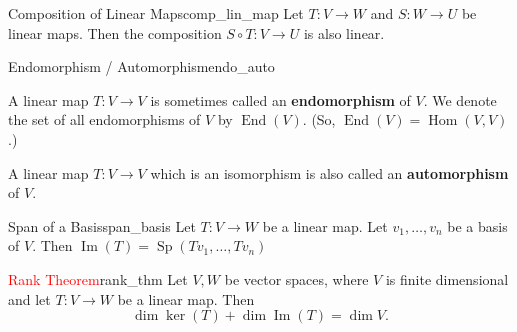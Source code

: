 \begin{lemma}{Composition of Linear Maps}{comp_lin_map}
	Let $T:V \to W$ and $S:W \to U$ be linear maps. Then the composition $S \circ T:V \to U$ is also linear.
\end{lemma}

\begin{definition}{Endomorphism / Automorphism}{endo_auto}
	
	A linear map $T:V \to V$ is sometimes called an \textbf{endomorphism} of $V$. We denote the set of all endomorphisms of $V$ by $\operatorname{End}(V)$. (So, $\operatorname{End}(V) = \operatorname{Hom}(V, V)$.)
	
	A linear map $T:V \to V$ which is an isomorphism is also called an \textbf{automorphism} of $V$.
\end{definition}

\begin{lemma}{Span of a Basis}{span_basis}
	Let $T:V \to W$ be a linear map. Let $v_1, \hdots , v_n$ be a basis of $V$. Then $\operatorname{Im}(T) = \operatorname{Sp}(Tv_1, \hdots , Tv_n)$
\end{lemma}

\begin{theorem}{\textcolor{red}{Rank Theorem}}{rank_thm}
	Let $V, W$ be vector spaces, where $V$ is finite dimensional and let $T: V \to W$ be a linear map. Then
	\[
	\dim \ker(T) + \dim \operatorname{Im}(T) = \dim V.
	\]
\end{theorem}

